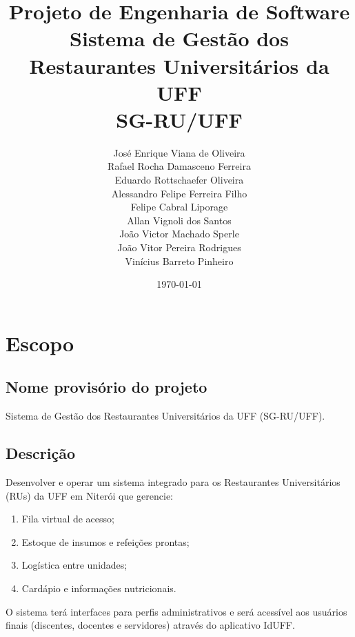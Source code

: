 \documentclass[12pt,a4paper]{article}
\begin{document}
\title{
    \textbf{Projeto de Engenharia de Software} \\[0.5em]
    \large Sistema de Gestão dos Restaurantes Universitários da UFF \\[0.3em]
    \normalsize SG-RU/UFF
}
\author{
    José Enrique Viana de Oliveira \\
    Rafael Rocha Damasceno Ferreira \\
    Eduardo Rottschaefer Oliveira \\
    Alessandro Felipe Ferreira Filho \\ 
    Felipe Cabral Liporage \\
    Allan Vignoli dos Santos \\
    João Victor Machado Sperle \\
    João Vitor Pereira Rodrigues\\
    Vinícius Barreto Pinheiro\\
}
\date{\today}

\maketitle
\thispagestyle{empty}

\newpage
\tableofcontents
\newpage

\section{Escopo}

\subsection{Nome provisório do projeto}
Sistema de Gestão dos Restaurantes Universitários da UFF (SG-RU/UFF).

\subsection{Descrição}
Desenvolver e operar um sistema integrado para os Restaurantes Universitários (RUs) da UFF em Niterói que gerencie:
\begin{enumerate}
    \item Fila virtual de acesso;
    \item Estoque de insumos e refeições prontas;
    \item Logística entre unidades;
    \item Cardápio e informações nutricionais.
\end{enumerate}
O sistema terá interfaces para perfis administrativos e será acessível aos usuários finais (discentes, docentes e servidores) através do aplicativo IdUFF.
\end{document}
